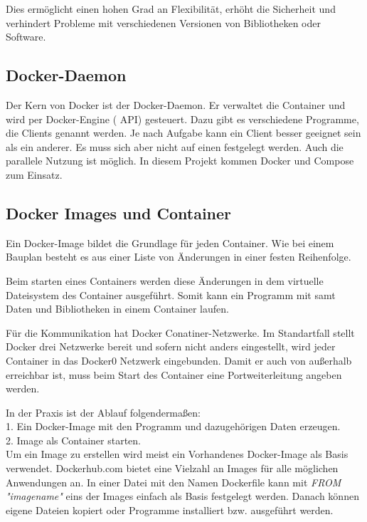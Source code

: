 Dies ermöglicht einen hohen Grad an Flexibilität, erhöht die Sicherheit und verhindert Probleme mit verschiedenen Versionen von Bibliotheken oder Software.

\cite{dockerDummies}
\cite{dockerOverview}

\subsection{Docker-Daemon}
Der Kern von Docker ist der Docker-Daemon. Er verwaltet die Container und wird per Docker-Engine ( API) gesteuert. Dazu gibt es verschiedene Programme, die Clients genannt werden. Je nach Aufgabe kann ein Client besser geeignet sein als ein anderer. Es muss sich aber nicht auf einen festgelegt werden. Auch die parallele Nutzung ist möglich. In diesem Projekt kommen Docker und Compose zum Einsatz.
\cite{dockerDaemon}
\cite{dockerDaemon}

\subsection{Docker Images und Container}
Ein Docker-Image bildet die Grundlage für jeden Container. Wie bei einem Bauplan besteht es aus einer Liste von Änderungen in einer festen Reihenfolge.

Beim starten eines Containers werden diese Änderungen in dem virtuelle Dateisystem des Container ausgeführt. Somit kann ein Programm mit samt Daten und Bibliotheken in einem Container laufen.

Für die Kommunikation hat Docker Conatiner-Netzwerke. Im Standartfall stellt Docker drei Netzwerke bereit und sofern nicht anders eingestellt, wird jeder Container in das Docker0 Netzwerk eingebunden. Damit er auch von außerhalb erreichbar ist, muss beim Start des Container eine Portweiterleitung angeben werden.

In der Praxis ist der Ablauf folgendermaßen: \\
1. Ein Docker-Image mit den Programm und dazugehörigen Daten erzeugen. \\
2. Image als Container starten. \\
Um ein Image zu erstellen wird meist ein Vorhandenes Docker-Image als Basis verwendet. Dockerhub.com bietet eine Vielzahl an Images für alle möglichen Anwendungen an.
In einer Datei mit den Namen Dockerfile kann mit \emph{FROM "imagename"} eins der Images einfach als Basis festgelegt werden. Danach können eigene Dateien kopiert oder Programme installiert bzw. ausgeführt werden.

